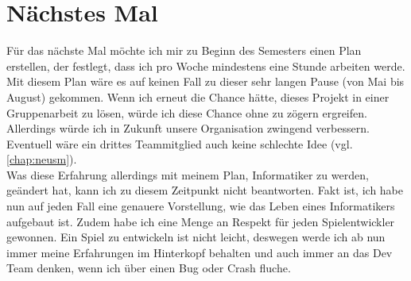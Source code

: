 \section{Nächstes Mal}
Für das nächste Mal möchte ich mir zu Beginn des Semesters einen Plan erstellen, der festlegt, dass ich pro Woche mindestens eine Stunde arbeiten werde. Mit diesem Plan wäre es auf keinen Fall zu dieser sehr langen
Pause (von Mai bis August) gekommen. Wenn ich erneut die Chance hätte, dieses Projekt in einer Gruppenarbeit zu lösen, würde ich diese Chance ohne zu zögern ergreifen. Allerdings würde ich in Zukunft
unsere Organisation zwingend verbessern. Eventuell wäre ein drittes Teammitglied auch keine schlechte Idee (vgl. \autoref{chap:neusm}).\\
Was diese Erfahrung allerdings mit meinem Plan, Informatiker zu werden, geändert hat, kann ich zu diesem Zeitpunkt nicht beantworten. Fakt ist, ich habe nun auf jeden Fall eine genauere Vorstellung,
wie das Leben eines Informatikers aufgebaut ist. Zudem habe ich eine Menge an Respekt für jeden Spielentwickler gewonnen. Ein Spiel zu entwickeln ist nicht leicht, deswegen werde ich ab nun immer meine Erfahrungen im Hinterkopf
behalten und auch immer an das Dev Team denken, wenn ich über einen Bug oder Crash fluche.